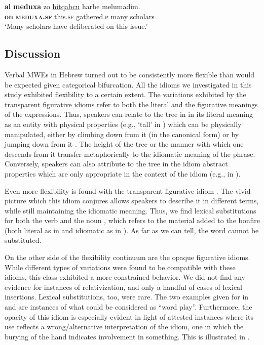 \documentclass[output=paper]{langsci/langscibook}
\begin{document}
    \ea\label{meduxa-sub}
         \gll \textbf{{\ayin}al} \textbf{meduxa} zo \underline{hitqabcu} harbe melumadim.\\
             \textbf{on} \textbf{\textsc{meduxa}.\textsc{sf}} this.\textsc{sf}  \underline{gathered.\textsc{p}} many scholars\\
        \glt `Many scholars have deliberated on this issue.'
    \z


\subsection{Discussion}

Verbal MWEs in Hebrew turned out to be consistently more flexible than would be expected given  categorical bifurcation. All the idioms we investigated in this study exhibited flexibility to a certain extent. The variations exhibited by the transparent figurative idioms refer to both the literal and the figurative meanings of the expressions. Thus, speakers can relate to the tree in  in its literal meaning as an entity with physical properties (e.g., `tall' in ) which can be physically manipulated, either by climbing down from it (in the canonical form) or by jumping down from it . The height of the tree or the manner with which one descends  from it transfer metaphorically to the idiomatic meaning of the phrase. Conversely, speakers can also attribute to the tree in the idiom abstract properties which are only appropriate in the context of the idiom (e.g.,  in ).

Even more flexibility is found with the transparent figurative idiom . The vivid picture which this idiom conjures allows speakers to describe it in different terms, while still maintaining the idiomatic meaning. Thus, we find lexical substitutions for both the verb  and the noun , which refers to the material added to the bonfire (both literal as in  and idiomatic as in ). As far as we can tell, the word  cannot be substituted.

On the other side of the flexibility continuum are the opaque figurative idioms. While different types of variations were found to be compatible with these idioms, this class exhibited a more constrained behavior. We did not find any evidence for instances of relativization, and only a handful of cases of lexical insertions. Lexical substitutions, too, were rare. The two examples given for  in  and  are instances of what could be considered as ``word play''. Furthermore, the opacity of this idiom is especially evident in light of attested instances where its use reflects a wrong/alternative interpretation of the idiom, one in which the burying of the hand indicates involvement in something. This is illustrated in .
\end{document}
